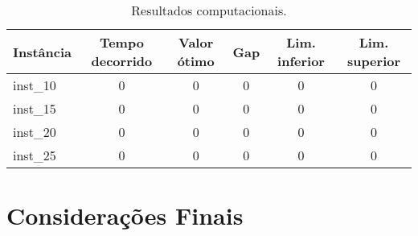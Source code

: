 \documentclass[12pt]{article}
\begin{document}
\begin{table}[h!]
  \begin{center}
    \caption{Resultados computacionais.}
    \label{tab:table1}
    \begin{tabular}{l|c|c|c|c|c}
      \hline
      \textbf{Instância} & \textbf{Tempo decorrido} & \textbf{Valor ótimo} & \textbf{Gap} & \textbf{Lim. inferior} & \textbf{Lim. superior} \\

      \hline
      inst\_10           & 0                        & 0                    & 0            & 0                      & 0                      \\

      \hline

      inst\_15           & 0                        & 0                    & 0            & 0                      & 0                      \\

      \hline

      inst\_20           & 0                        & 0                    & 0            & 0                      & 0                      \\

      \hline

      inst\_25           & 0                        & 0                    & 0            & 0                      & 0                      \\ \hline
    \end{tabular}
  \end{center}
\end{table}


\section{Considerações Finais}



\end{document}
